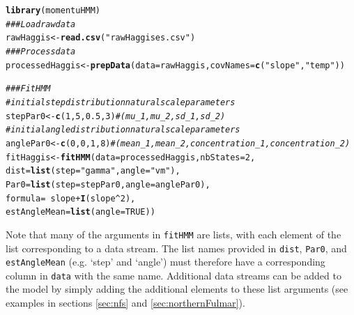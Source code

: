 \documentclass[12pt]{article}\usepackage[]{graphicx}\usepackage[]{color}
\makeatletter
\newcommand{\hlnum}[1]{\textcolor[rgb]{0.686,0.059,0.569}{#1}}%
\newcommand{\hlstr}[1]{\textcolor[rgb]{0.192,0.494,0.8}{#1}}%
\newcommand{\hlcom}[1]{\textcolor[rgb]{0.678,0.584,0.686}{\textit{#1}}}%
\newcommand{\hlopt}[1]{\textcolor[rgb]{0,0,0}{#1}}%
\newcommand{\hlstd}[1]{\textcolor[rgb]{0.345,0.345,0.345}{#1}}%
\newcommand{\hlkwb}[1]{\textcolor[rgb]{0.69,0.353,0.396}{#1}}%
\newcommand{\hlkwc}[1]{\textcolor[rgb]{0.333,0.667,0.333}{#1}}%
\newcommand{\hlkwd}[1]{\textcolor[rgb]{0.737,0.353,0.396}{\textbf{#1}}}%
\newenvironment{kframe}{%
 \def\at@end@of@kframe{}%
 \ifinner\ifhmode%
  \def\at@end@of@kframe{\end{minipage}}%
  \begin{minipage}{\columnwidth}%
 \fi\fi%
 \def\FrameCommand##1{\hskip\@totalleftmargin \hskip-\fboxsep
 \colorbox{shadecolor}{##1}\hskip-\fboxsep
     \hskip-\linewidth \hskip-\@totalleftmargin \hskip\columnwidth}%
 \MakeFramed {\advance\hsize-\width
   \@totalleftmargin\z@ \linewidth\hsize
   \@setminipage}}%
 {\par\unskip\endMakeFramed%
 \at@end@of@kframe}
\newenvironment{knitrout}{}{} %
\makeatother
\begin{document}
\begin{knitrout}
\color{fgcolor}\begin{kframe}
\begin{alltt}
\hlkwd{library}\hlstd{(momentuHMM)}
\hlcom{### Load raw data}
\hlstd{rawHaggis}\hlkwb{<-}\hlkwd{read.csv}\hlstd{(}\hlstr{"rawHaggises.csv"}\hlstd{)}
\hlcom{### Process data}
\hlstd{processedHaggis}\hlkwb{<-}\hlkwd{prepData}\hlstd{(}\hlkwc{data}\hlstd{=rawHaggis,}\hlkwc{covNames}\hlstd{=}\hlkwd{c}\hlstd{(}\hlstr{"slope"}\hlstd{,}\hlstr{"temp"}\hlstd{))}

\hlcom{### Fit HMM	}
\hlcom{# initial step distribution natural scale parameters}
\hlstd{stepPar0} \hlkwb{<-} \hlkwd{c}\hlstd{(}\hlnum{1}\hlstd{,}\hlnum{5}\hlstd{,}\hlnum{0.5}\hlstd{,}\hlnum{3}\hlstd{)} \hlcom{# (mu_1,mu_2,sd_1,sd_2)}
\hlcom{# initial angle distribution natural scale parameters }
\hlstd{anglePar0} \hlkwb{<-} \hlkwd{c}\hlstd{(}\hlnum{0}\hlstd{,}\hlnum{0}\hlstd{,}\hlnum{1}\hlstd{,}\hlnum{8}\hlstd{)} \hlcom{# (mean_1,mean_2,concentration_1,concentration_2)       	}
\hlstd{fitHaggis} \hlkwb{<-} \hlkwd{fitHMM}\hlstd{(}\hlkwc{data} \hlstd{= processedHaggis,} \hlkwc{nbStates} \hlstd{=} \hlnum{2}\hlstd{,}
                    \hlkwc{dist} \hlstd{=} \hlkwd{list}\hlstd{(}\hlkwc{step} \hlstd{=} \hlstr{"gamma"}\hlstd{,} \hlkwc{angle} \hlstd{=} \hlstr{"vm"}\hlstd{),}
                    \hlkwc{Par0} \hlstd{=} \hlkwd{list}\hlstd{(}\hlkwc{step} \hlstd{= stepPar0,} \hlkwc{angle} \hlstd{= anglePar0),}
                    \hlkwc{formula} \hlstd{=} \hlopt{~} \hlstd{slope} \hlopt{+} \hlkwd{I}\hlstd{(slope}\hlopt{^}\hlnum{2}\hlstd{),}
                    \hlkwc{estAngleMean} \hlstd{=} \hlkwd{list}\hlstd{(}\hlkwc{angle}\hlstd{=}\hlnum{TRUE}\hlstd{))}
\end{alltt}
\end{kframe}
\end{knitrout}
Note that many of the arguments in \verb|fitHMM| are lists, with each element of the list corresponding to a data stream.  The list names provided in \verb|dist|, \verb|Par0|, and \verb|estAngleMean| (e.g. `step' and `angle') must therefore have a corresponding column in \verb|data| with the same name.  Additional data streams can be added to the model by simply adding the additional elements to these list arguments (see examples in sections \ref{sec:nfs} and \ref{sec:northernFulmar}).  
\end{document}
